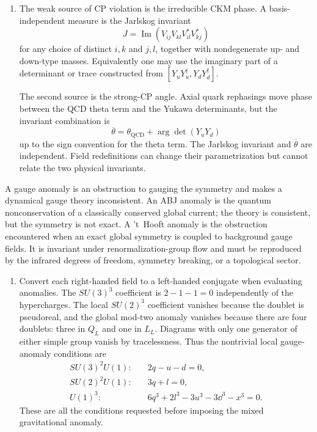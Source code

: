 \begin{enumerate}
\begin{enumerate}
    \item[(v)]
    The weak source of CP violation is the irreducible CKM phase.  A
    basis-independent measure is the Jarlskog invariant
    \[
      J=\operatorname{Im}
       \left(V_{ij}V_{kl}V_{il}^*V_{kj}^*\right)
    \]
    for any choice of distinct \(i,k\) and \(j,l\), together with
    nondegenerate up- and down-type masses.  Equivalently one may use the
    imaginary part of a determinant or trace constructed from
    \([Y_uY_u^\dagger,Y_dY_d^\dagger]\).

    The second source is the strong-CP angle.  Axial quark rephasings move
    phase between the QCD theta term and the Yukawa determinants, but the
    invariant combination is
    \[
      \boxed{\overline\theta
       =\theta_{\mathrm{QCD}}+\arg\det(Y_uY_d)}
    \]
    up to the sign convention for the theta term.  The Jarlskog invariant
    and \(\overline\theta\) are independent.  Field redefinitions can
    change their parametrization but cannot relate the two physical
    invariants.
  \end{enumerate}

  A gauge anomaly is an obstruction to gauging the symmetry and makes a
  dynamical gauge theory inconsistent.  An ABJ anomaly is the quantum
  nonconservation of a classically conserved global current; the theory is
  consistent, but the symmetry is not exact.  A 't~Hooft anomaly is the
  obstruction encountered when an exact global symmetry is coupled to
  background gauge fields.  It is invariant under renormalization-group
  flow and must be reproduced by the infrared degrees of freedom, symmetry
  breaking, or a topological sector.

  \begin{enumerate}
    \item[(i)]
    Convert each right-handed field to a left-handed conjugate when
    evaluating anomalies.  The \(SU(3)^3\) coefficient is
    \(2-1-1=0\) independently of the hypercharges.  The local
    \(SU(2)^3\) coefficient vanishes because the doublet is pseudoreal,
    and the global mod-two anomaly vanishes because there are four
    doublets: three in \(Q_L\) and one in \(L_L\).  Diagrams with only one
    generator of either simple group vanish by tracelessness.  Thus the
    nontrivial local gauge-anomaly conditions are
    \[
    \begin{aligned}
      SU(3)^2U(1):\quad&2q-u-d=0,\\
      SU(2)^2U(1):\quad&3q+l=0,\\
      U(1)^3:\quad&
        6q^3+2l^3-3u^3-3\dd^3-x^3=0.
    \end{aligned}
    \]
    These are all the conditions requested before imposing the mixed
    gravitational anomaly.


\end{enumerate}
\end{enumerate}
